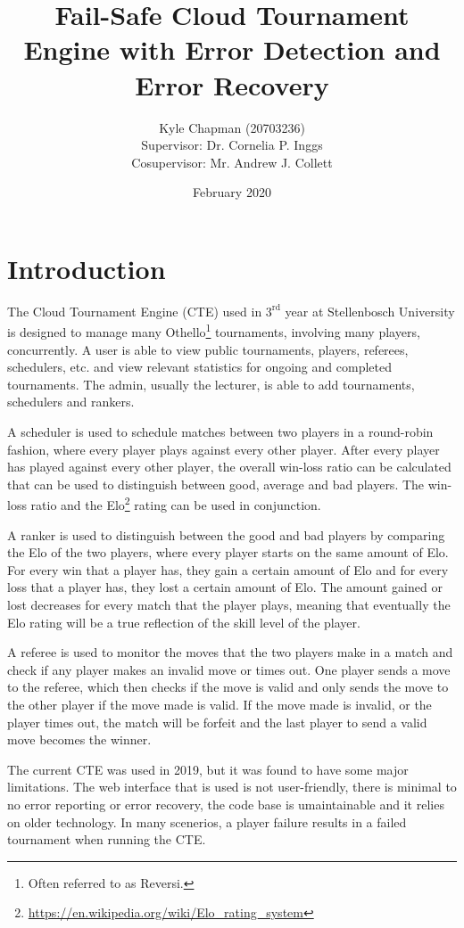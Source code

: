 \documentclass[a4paper, 12pt]{article}
\title{Fail-Safe Cloud Tournament Engine with Error Detection and Error
Recovery}
\author{
	{Kyle Chapman (20703236)} \\
	{Supervisor: Dr. Cornelia P. Inggs} \\
	{Cosupervisor: Mr. Andrew J. Collett}
}
\date{February 2020}
\begin{document}
\maketitle

\section{Introduction}

The Cloud Tournament Engine (CTE) used in $3^{\text{rd}}$ year at Stellenbosch
University is \mbox{designed} to manage many Othello\footnote{Often referred to as
Reversi.} tournaments, involving many players, concurrently. A user is able to
view public tournaments, players, referees, schedulers, etc. and view \mbox{relevant}
statistics for ongoing and completed tournaments. The admin, usually the \mbox{lecturer},
is able to add tournaments, schedulers and rankers.

\vspace{0.8em}
A scheduler is used to schedule matches between two players in a round-robin
\mbox{fashion}, where every player plays against every other player. After every player
has played against every other player, the overall win-loss ratio can be calculated
that can be used to \mbox{distinguish} between good, average and bad players. The
win-loss ratio and the Elo\footnote{\url{https://en.wikipedia.org/wiki/Elo_rating_system}}
rating can be used in conjunction.

\vspace{0.8em}
A ranker is used to distinguish between the good and bad players by comparing
the Elo of the two players, where every player starts on the same amount of Elo.
For every win that a player has, they gain a certain amount of Elo and for every
loss that a player has, they lost a certain amount of Elo. The amount gained or
lost decreases for every match that the player plays, meaning that eventually
the Elo rating will be a true reflection of the skill level of the player.

\vspace{0.8em}
A referee is used to monitor the moves that the two players make in a match and
check if any player makes an invalid move or times out. One player sends a
move to the referee, which then checks if the move is valid and only sends
the move to the other player if the move made is valid. If the move made is
invalid, or the player times out, the match will be forfeit and the last player
to send a valid move becomes the winner.

\vspace{0.8em}
The current CTE was used in 2019, but it was found to have some major limitations.
The web interface that is used is not user-friendly, there is minimal to no
error reporting or error recovery, the code base is umaintainable and it
relies on older technology. In many scenerios, a player failure results in
a failed tournament when running the CTE.
\end{document}
